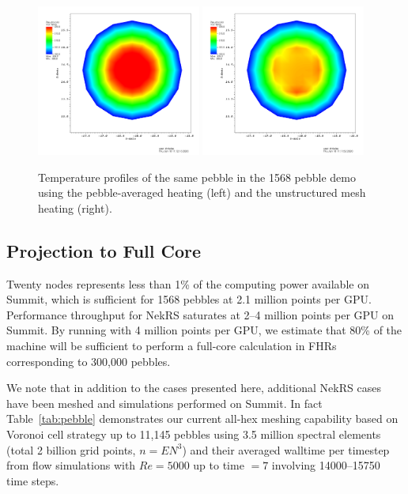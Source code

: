 \begin{figure}[!h]
\centering
\includegraphics[clip=true,width=0.48\textwidth]{Figures/openmc_cell_temperature_zoomed}
\includegraphics[clip=true,width=0.48\textwidth]{Figures/openmc_mesh_temperature_zoomed}
\caption{Temperature profiles of the same pebble in the 1568 pebble demo using
the pebble-averaged heating (left) and the unstructured mesh heating (right).}
\label{f:1568_openmc_temperatures_single_pebble}
\end{figure}

\subsection{Projection to Full Core}

Twenty nodes represents less than 1\% of the computing power available on
Summit, which is sufficient for 1568 pebbles at 2.1 million points per
GPU.  Performance throughput for NekRS saturates at 2--4 million points
per GPU on Summit.  By running with 4 million points per GPU, we estimate that
80\% of the machine will be sufficient to perform a full-core calculation in
FHRs corresponding to 300,000 pebbles.

We note that in addition to the cases presented here, additional NekRS cases have been meshed and simulations performed on Summit. In fact Table~\ref{tab:pebble} demonstrates our current all-hex meshing capability based on Voronoi cell strategy up to 11,145 pebbles using 3.5 million spectral elements (total 2 billion grid points, $n = EN^3$)  and their averaged walltime per timestep from flow simulations with $Re= 5000$ up to time $=7$ involving 14000--15750 time steps.

